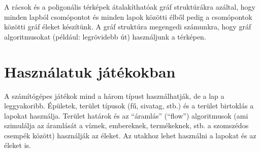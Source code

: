 \noindent A rácsok és a poligonális térképek átalakíthatóak gráf struktúrákra azáltal, hogy minden lapból csomópontot és minden lapok közötti élből pedig a csomópontok közötti gráf éleket készítünk. A gráf struktúra megengedi számunkra, hogy gráf algoritmusokat (például: legrövidebb út) használjunk a térképen.

\section*{Használatuk játékokban}

A számítógépes játékok mind a három típust használhatják, de a lap a leggyakoribb. Épületek, terület típusok (fű, sivatag, stb.) és a terület birtoklás a lapokat használja. Terület határok és az “áramlás” (“flow”) algoritmusok (ami szimulálja az áramlását a víznek, embereknek, termékeknek, stb. a szomszédos csempék között) használják az éleket. Az utakhoz lehet használni a lapokat és az éleket is.